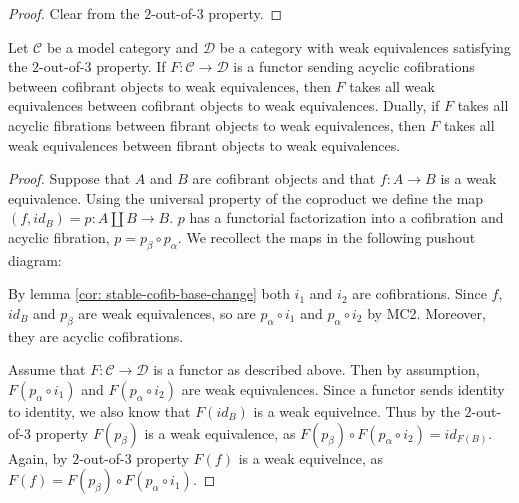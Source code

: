 \documentclass[../thesis.tex]{subfiles}
\begin{document}
            \begin{proof}
                Clear from the $2$-out-of-$3$ property.
            \end{proof}

            \begin{lemma}\label{lem: Ken-Brown}
                Let $\mathcal{C}$ be a model category and $\mathcal{D}$ be a category with weak equivalences satisfying the $2$-out-of-$3$ property. If $F:\mathcal{C} \rightarrow \mathcal{D}$ is a functor sending acyclic cofibrations between cofibrant objects to weak equivalences, then $F$ takes all weak equivalences between cofibrant objects to weak equivalences. Dually, if $F$ takes all acyclic fibrations between fibrant objects to weak equivalences, then $F$ takes all weak equivalences between fibrant objects to weak equivalences.
            \end{lemma}

            \begin{proof}
                Suppose that $A$ and $B$ are cofibrant objects and that $f:A\rightarrow B$ is a weak equivalence. Using the universal property of the coproduct we define the map $(f, id_B) = p: A\coprod B \rightarrow B$. $p$ has a functorial factorization into a cofibration and acyclic fibration, $p = p_\beta\circ p_\alpha$. We recollect the maps in the following pushout diagram:
                \begin{center}
                \end{center}
                By lemma \ref{cor: stable-cofib-base-change} both $i_1$ and $i_2$ are cofibrations. Since $f$, $id_B$ and $p_\beta$ are weak equivalences, so are $p_\alpha\circ i_1$ and $p_\alpha\circ i_2$ by MC2. Moreover, they are acyclic cofibrations.

                Assume that $F:\mathcal{C}\rightarrow\mathcal{D}$ is a functor as described above. Then by assumption, $F(p_\alpha\circ i_1)$ and $F(p_\alpha\circ i_2)$ are weak equivalences. Since a functor sends identity to identity, we also know that $F(id_B)$ is a weak equivelnce. Thus by the $2$-out-of-$3$ property $F(p_\beta)$ is a weak equivalence, as $F(p_\beta)\circ F(p_\alpha\circ i_2) = id_{F(B)}$. Again, by $2$-out-of-$3$ property $F(f)$ is a weak equivelnce, as $F(f) = F(p_\beta)\circ F(p_\alpha\circ i_1)$.
            \end{proof}
\end{document}
